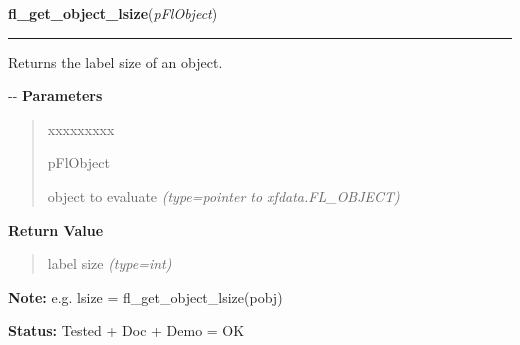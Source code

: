 \hspace{.8\funcindent}\begin{boxedminipage}{\funcwidth}

    \raggedright \textbf{fl\_get\_object\_lsize}(\textit{pFlObject})

    \vspace{-1.5ex}

    \rule{\textwidth}{0.5\fboxrule}
\setlength{\parskip}{2ex}

Returns the label size of an object.

-{}-
\setlength{\parskip}{1ex}
      \textbf{Parameters}
      \vspace{-1ex}

      \begin{quote}
        \begin{Ventry}{xxxxxxxxx}

          \item[pFlObject]


object to evaluate
            {\it (type=pointer to xfdata.FL\_OBJECT)}

        \end{Ventry}

      \end{quote}

      \textbf{Return Value}
    \vspace{-1ex}

      \begin{quote}

label size
      {\it (type=int)}

      \end{quote}

\textbf{Note:} 
e.g. lsize = fl\_get\_object\_lsize(pobj)


\textbf{Status:} 
Tested + Doc + Demo = OK


    \end{boxedminipage}

    \label{xformslib:flbasic:fl_set_object_lstyle}

    \vspace{0.5ex}

